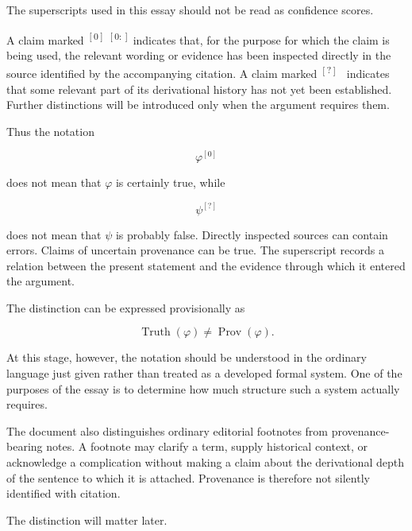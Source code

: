 \documentclass[
  11pt,
  a4paper,
  DIV=12,
  BCOR=0mm,
  parskip=half-
]{scrartcl}
\newcommand{\provn}[2][]{%
  \if\relax\detokenize{#1}\relax
    \textsuperscript{$[#2]$}%
  \else
    \textsuperscript{$[#2:#1]$}%
  \fi
}
\newcommand{\provq}{%
  \textsuperscript{$[?]$}%
}
\newcommand{\Truth}{\operatorname{Truth}}
\newcommand{\Prov}{\operatorname{Prov}}
\theoremstyle{definition}
\theoremstyle{plain}
\theoremstyle{remark}
\begin{document}
The superscripts used in this essay should not be read as confidence scores.

A claim marked \provn{0} indicates that, for the purpose for which the claim is
being used, the relevant wording or evidence has been inspected directly in
the source identified by the accompanying citation. A claim marked
\provq\ indicates that some relevant part of its derivational history has not
yet been established. Further distinctions will be introduced only when the
argument requires them.

Thus the notation

\[
  \varphi^{[0]}
\]

does not mean that \(\varphi\) is certainly true, while

\[
  \psi^{[?]}
\]

does not mean that \(\psi\) is probably false. Directly inspected sources can
contain errors. Claims of uncertain provenance can be true. The superscript
records a relation between the present statement and the evidence through which
it entered the argument.

The distinction can be expressed provisionally as

\[
  \Truth(\varphi)
  \neq
  \Prov(\varphi).
\]

At this stage, however, the notation should be understood in the ordinary
language just given rather than treated as a developed formal system. One of
the purposes of the essay is to determine how much structure such a system
actually requires.

The document also distinguishes ordinary editorial footnotes from
provenance-bearing notes. A footnote may clarify a term, supply historical
context, or acknowledge a complication without making a claim about the
derivational depth of the sentence to which it is attached. Provenance is
therefore not silently identified with citation.

The distinction will matter later.

\clearpage


\tableofcontents

\clearpage

\end{document}
